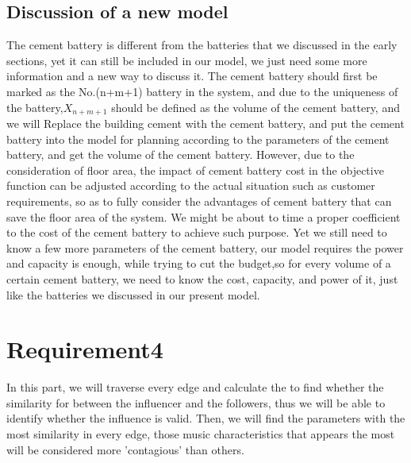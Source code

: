 \documentclass{article}
\begin{document}
\subsection{Discussion of a new model}
The cement battery is different from the batteries that we discussed in the early sections, yet it can still be included in our model, we just need  some more information and a new way to discuss it.
The cement battery should first be marked as the No.(n+m+1) battery in the system, and due to the uniqueness of the battery,$X_{n+m+1}$ should be defined as the volume of the cement battery, and we will Replace the building cement with the cement battery, and
put the cement battery into the model for planning according to the parameters of the cement battery, and get the volume of the cement battery. However, due to the consideration of
floor area, the impact of cement battery cost in the objective function can be adjusted according to the actual situation such as customer requirements, so as to fully consider the advantages of
cement battery that can save the floor area of the system. We might be about to time a proper coefficient to the cost of the cement battery to achieve such purpose. Yet we still need to know a few more parameters of the cement battery, our model requires the power and capacity is enough, while trying to cut the budget,so for every volume of a certain cement battery, we need to know the cost, capacity, and power of it,
just like the batteries we discussed in our present model.
\newpage \section{Requirement4}\Large
In this part, we will traverse every edge and calculate the to find whether the similarity for between the influencer and the followers, thus we will be able to identify whether the influence is valid.
Then, we will find the parameters with the most similarity in every edge, those music characteristics that appears the most will be considered more
'contagious' than others.
\end{document}
